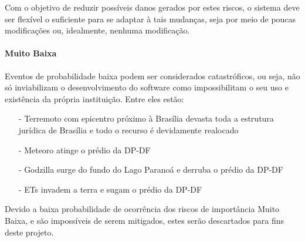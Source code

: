 \documentclass[12pt,a4paper]{report}
\begin{document}
Com o objetivo de reduzir possíveis danos gerados por estes riscos, o sistema deve ser flexível o suficiente para se adaptar à tais mudanças, seja por meio de poucas modificações ou, idealmente, nenhuma modificação.

\paragraph{Muito Baixa} Eventos de probabilidade baixa podem ser considerados catastróficos, ou seja, não só inviabilizam o desenvolvimento do software como impossibilitam o seu uso e existência da própria instituição. Entre eles estão:
\begin{itemize}
\item [-] Terremoto com epicentro próximo à Brasília devasta toda a estrutura jurídica de Brasília e todo o recurso é devidamente realocado
\item [-] Meteoro atinge o prédio da DP-DF
\item [-] Godzilla surge do fundo do Lago Paranoá e derruba o prédio da DP-DF
\item [-] ETs invadem a terra e sugam o prédio da DP-DF
\end{itemize}


Devido a baixa probabilidade de ocorrência dos riscos de importância Muito Baixa, e são impossíveis de serem mitigados, estes serão descartados para fins deste projeto. 



\end{document}
